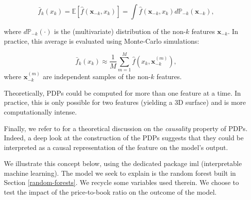 \documentclass[]{krantz}
\makeatletter
\newenvironment{Shaded}{\begin{snugshade}}{\end{snugshade}}
\newcommand{\CommentTok}[1]{\textcolor[rgb]{0.37,0.37,0.37}{\textit{#1}}}
\newcommand{\DataTypeTok}[1]{\textcolor[rgb]{0.27,0.27,0.27}{#1}}
\newcommand{\KeywordTok}[1]{\textcolor[rgb]{0.27,0.27,0.27}{\textbf{#1}}}
\newcommand{\NormalTok}[1]{#1}
\newcommand{\OperatorTok}[1]{\textcolor[rgb]{0.43,0.43,0.43}{\textbf{#1}}}
\newcommand{\StringTok}[1]{\textcolor[rgb]{0.5,0.5,0.5}{#1}}
\newenvironment{kframe}{%
\medskip{}
\setlength{\fboxsep}{.8em}
 \def\at@end@of@kframe{}%
 \ifinner\ifhmode%
  \def\at@end@of@kframe{\end{minipage}}%
  \begin{minipage}{\columnwidth}%
 \fi\fi%
 \def\FrameCommand##1{\hskip\@totalleftmargin \hskip-\fboxsep
 \colorbox{shadecolor}{##1}\hskip-\fboxsep
     \hskip-\linewidth \hskip-\@totalleftmargin \hskip\columnwidth}%
 \MakeFramed {\advance\hsize-\width
   \@totalleftmargin\z@ \linewidth\hsize
   \@setminipage}}%
 {\par\unskip\endMakeFramed%
 \at@end@of@kframe}
\renewenvironment{Shaded}{\begin{kframe}}{\end{kframe}}
\theoremstyle{definition}
\theoremstyle{definition}
\theoremstyle{definition}
\theoremstyle{remark}
\makeatother
\begin{document}
\begin{equation}
\label{eq:pdp} 
\bar{f}_k(x_k)=\mathbb{E}[\hat{f}(\textbf{x}_{-k},x_k)]=\int \hat{f}(\textbf{x}_{-k},x_k)d\mathbb{P}_{-k}(\textbf{x}_{-k}),
\end{equation}

where \(d\mathbb{P}_{-k}(\cdot)\) is the (multivariate) distribution of
the non-\(k\) features \(\textbf{x}_{-k}\). In practice, this average is
evaluated using Monte-Carlo simulations:

\begin{equation}
\label{eq:pdpMC} 
\bar{f}_k(x_k)\approx \frac{1}{M}\sum_{m=1}^M\hat{f}\left(x_k,\textbf{x}_{-k}^{(m)}\right),
\end{equation} where \(\textbf{x}_{-k}^{(m)}\) are independent samples
of the non-\(k\) features.

Theoretically, PDPs could be computed for more than one feature at a
time. In practice, this is only possible for two features (yielding a 3D
surface) and is more computationally intense.

Finally, we refer to \citet{zhao2019causal} for a theoretical discussion
on the \emph{causality} property of PDPs. Indeed, a deep look at the
construction of the PDPs suggests that they could be interpreted as a
causal representation of the feature on the model's output.

We illustrate this concept below, using the dedicated package iml
(interpretable machine learning). The model we seek to explain is the
random forest built in Section \ref{random-forests}. We recycle some
variables used therein. We choose to test the impact of the
price-to-book ratio on the outcome of the model.

\footnotesize

\begin{Shaded}
\end{Shaded}
\end{document}
